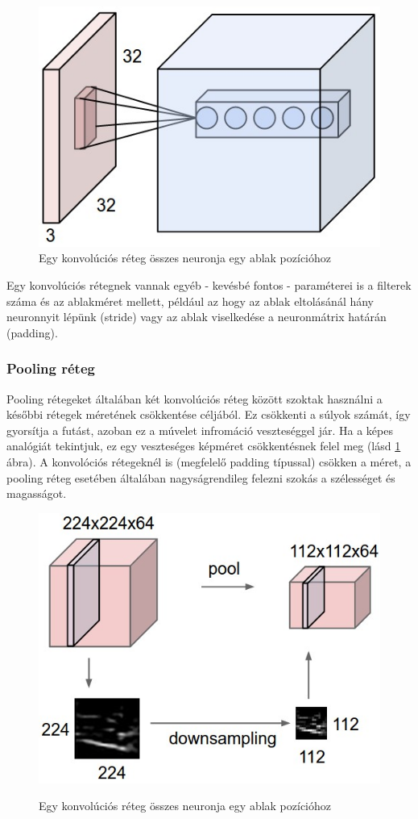 \documentclass[12pt]{article}
\begin{document}
\begin{figure}[h!]
\begin{center}
  \includegraphics[width=0.5\linewidth]{depthcol.jpg}
  \caption{Egy konvolúciós réteg összes neuronja egy ablak pozícióhoz}
\end{center}
\end{figure}

Egy konvolúciós rétegnek vannak egyéb - kevésbé fontos - paraméterei is a filterek száma és az ablakméret mellett, például az hogy az ablak eltolásánál hány neuronnyit lépünk (stride) vagy az ablak viselkedése a neuronmátrix határán (padding).

\subsubsection{Pooling réteg}

Pooling rétegeket általában két konvolúciós réteg között szoktak használni a későbbi rétegek méretének csökkentése céljából. Ez csökkenti a súlyok számát, így gyorsítja a futást, azoban ez a múvelet infromáció veszteséggel jár. Ha a képes analógiát tekintjuk, ez egy veszteséges képméret csökkentésnek felel meg (lásd \ref{pool} ábra). A konvolóciós rétegeknél is (megfelelő padding típussal) csökken a méret, a pooling réteg esetében általában nagyságrendileg felezni szokás a szélességet és magasságot.

\begin{figure}[h!]
\begin{center}
  \label{pool}
  \includegraphics[width=0.5\linewidth]{pool.jpeg}
  \caption{Egy konvolúciós réteg összes neuronja egy ablak pozícióhoz}
\end{center}
\end{figure}
\end{document}
